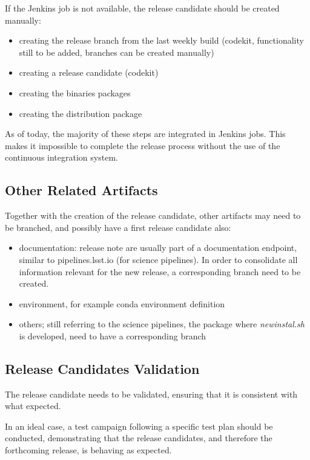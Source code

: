 If the Jenkins job is not available, the release candidate should be created manually:

\begin{itemize}
\item creating the release branch from the last weekly build (codekit, functionality still to be added, branches can be created manually)
\item creating a release candidate (codekit)
\item creating the binaries packages 
\item creating the distribution package
\end{itemize}

As of today, the majority of these steps are integrated in Jenkins jobs. This makes it impossible to complete the release process without the use of the continuous integration system.

\subsection{Other Related Artifacts}

Together with the creation of the release candidate, other artifacts may need to be branched, and possibly have a first release candidate also:

\begin{itemize}
\item documentation: release note are usually part of a documentation endpoint, similar to pipelines.lsst.io (for science pipelines). In order to consolidate all information relevant for the new release, a corresponding branch need to be created.
\item environment, for example conda environment definition
\item others; still referring to the science pipelines, the package where \textit{newinstal.sh} is developed, need to have a corresponding branch
\end{itemize}


\subsection{Release Candidates Validation} \label{sect:rcvalidation}

The release candidate needs to be validated, ensuring that it is consistent with what expected.

In an ideal case, a test campaign following a specific test plan should be conducted, demonstrating that the release candidates, and therefore the forthcoming release, is behaving as expected.

